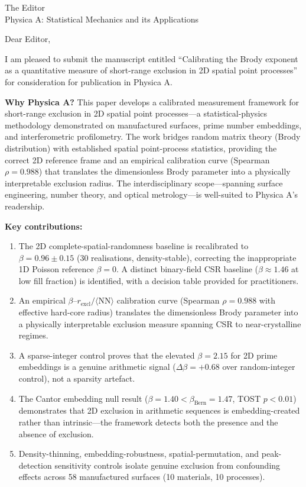 \documentclass{letter}
\begin{document}
\begin{letter}{The Editor\\Physica A: Statistical Mechanics and its Applications}

\opening{Dear Editor,}

I am pleased to submit the manuscript entitled ``Calibrating the Brody exponent as a quantitative measure of short-range exclusion in 2D spatial point processes'' for consideration for publication in Physica A.

\textbf{Why Physica A?} This paper develops a calibrated measurement framework for short-range exclusion in 2D spatial point processes---a statistical-physics methodology demonstrated on manufactured surfaces, prime number embeddings, and interferometric profilometry. The work bridges random matrix theory (Brody distribution) with established spatial point-process statistics, providing the correct 2D reference frame and an empirical calibration curve (Spearman $\rho=0.988$) that translates the dimensionless Brody parameter into a physically interpretable exclusion radius. The interdisciplinary scope---spanning surface engineering, number theory, and optical metrology---is well-suited to Physica A's readership.

\textbf{Key contributions:}
\begin{enumerate}
  \item The 2D complete-spatial-randomness baseline is recalibrated to $\beta=0.96\pm0.15$ (30 realisations, density-stable), correcting the inappropriate 1D Poisson reference $\beta=0$. A distinct binary-field CSR baseline ($\beta\approx1.46$ at low fill fraction) is identified, with a decision table provided for practitioners.
  \item An empirical $\beta$--$r_{\text{excl}}/\langle\text{NN}\rangle$ calibration curve (Spearman $\rho=0.988$ with effective hard-core radius) translates the dimensionless Brody parameter into a physically interpretable exclusion measure spanning CSR to near-crystalline regimes.
  \item A sparse-integer control proves that the elevated $\beta=2.15$ for 2D prime embeddings is a genuine arithmetic signal ($\Delta\beta=+0.68$ over random-integer control), not a sparsity artefact.
  \item The Cantor embedding null result ($\beta=1.40<\beta_{\text{Bern}}=1.47$, TOST $p<0.01$) demonstrates that 2D exclusion in arithmetic sequences is embedding-created rather than intrinsic---the framework detects both the presence and the absence of exclusion.
  \item Density-thinning, embedding-robustness, spatial-permutation, and peak-detection sensitivity controls isolate genuine exclusion from confounding effects across 58 manufactured surfaces (10 materials, 10 processes).
\end{enumerate}


\end{letter}
\end{document}
